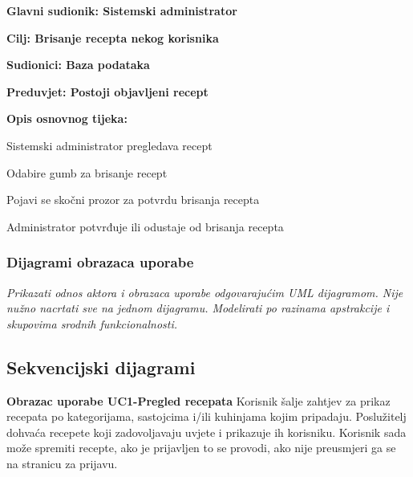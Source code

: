 	
	\noindent {}
	\begin{packed_item}
		
		\item \textbf{Glavni sudionik: Sistemski administrator}
		\item  \textbf{Cilj: Brisanje recepta nekog korisnika} 
		\item  \textbf{Sudionici: Baza podataka} 
		\item  \textbf{Preduvjet: Postoji objavljeni recept} 
		\item  \textbf{Opis osnovnog tijeka:}
		
		\item[] \begin{packed_enum}
			
			\item Sistemski administrator pregledava recept
			\item Odabire gumb za brisanje recept
			\item Pojavi se skočni prozor za potvrdu brisanja recepta
			\item Administrator potvrđuje ili odustaje od brisanja recepta
			
		\end{packed_enum}
		
	\end{packed_item}
		

				\subsubsection{Dijagrami obrazaca uporabe}
					
					\textit{Prikazati odnos aktora i obrazaca uporabe odgovarajućim UML dijagramom. Nije nužno nacrtati sve na jednom dijagramu. Modelirati po razinama apstrakcije i skupovima srodnih funkcionalnosti.}
				\eject		
				
			\subsection{Sekvencijski dijagrami}
				
				\noindent
				\textbf{Obrazac uporabe UC1-Pregled recepata}\newline
					{Korisnik šalje zahtjev za prikaz recepata po kategorijama, sastojcima i/ili kuhinjama kojim pripadaju. Poslužitelj dohvaća recepete koji zadovoljavaju uvjete i prikazuje ih korisniku. Korisnik sada može spremiti recepte, ako je prijavljen to se provodi, ako nije preusmjeri ga se na stranicu za prijavu.}
				
